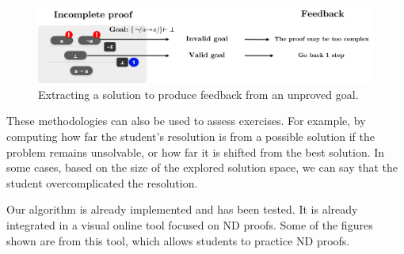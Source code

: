 \begin{figure}
    \centering
    \includegraphics[width=1\linewidth]{resources/trim-neg-feed.jpg}
    \caption{Extracting a solution to produce feedback from an unproved goal.}
    \label{fig:extract-solution2}
\end{figure}

These methodologies can also be used to assess exercises. For example, by computing how far the student’s resolution is from a possible solution if the problem remains unsolvable, or how far it is shifted from the best solution. In some cases, based on the size of the explored solution space, we can say that the student overcomplicated the resolution.

Our algorithm is already implemented and has been tested. It is already integrated in a visual online tool focused on ND proofs. Some of the figures shown are from this tool, which allows students to practice ND proofs.
